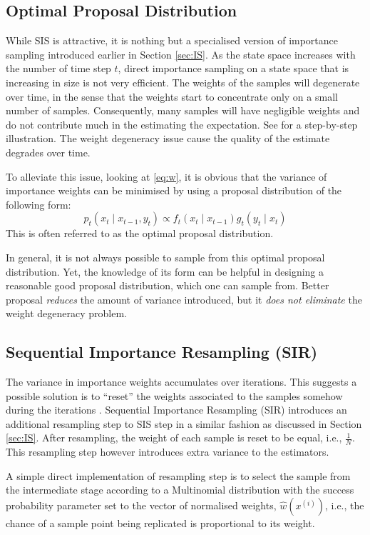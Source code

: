 \subsection{Optimal Proposal Distribution}
While SIS is attractive, it is nothing but a specialised version of importance sampling introduced earlier in Section \ref{sec:IS}. As the state space increases with the number of time step $t$, direct importance sampling on a state space that is increasing in size is not very efficient. The weights of the samples will degenerate over time, in the sense that the weights start to concentrate only on a small number of samples. Consequently, many samples will have negligible weights and do not contribute much in the estimating the expectation. See \cite{JAM10} for a step-by-step illustration. The weight degeneracy issue cause the quality of the estimate degrades over time.

To alleviate this issue, looking at \eqref{eq:w}, it is obvious that the variance of importance weights can be minimised by using a proposal distribution of the following form:
\begin{equation}
 p_{t}(x_{t} \mid x_{t-1}, y_t) \propto f_{t}(x_{t} \mid x_{t-1}) g_{t}(y_{t} \mid x_t)
\end{equation}
This is often referred to as the optimal proposal distribution.

In general, it is not always possible to sample from this optimal proposal distribution. Yet, the knowledge of its form can be helpful in designing a reasonable good proposal distribution, which one can sample from. Better
proposal \emph{reduces} the amount of variance introduced, but it \emph{does not eliminate} the weight degeneracy problem.

\subsection{Sequential Importance Resampling (SIR)}
The variance in importance weights accumulates over iterations. This suggests a possible solution is to ``reset'' the weights associated to the samples somehow during the iterations \cite{JAM10}. Sequential Importance Resampling (SIR) introduces an additional resampling step to SIS step in a similar fashion as discussed in Section \ref{sec:IS}. After resampling, the weight of each sample is reset to be equal, i.e., $\frac{1}{N}$. This resampling step however introduces extra variance to the estimators.

A simple direct implementation of resampling step is to select the sample from the intermediate stage according to a Multinomial distribution with the success probability parameter set to the vector of normalised weights, $\hat{w}(x^{(i)})$, i.e., the chance of a sample point being replicated is proportional to its weight. 


